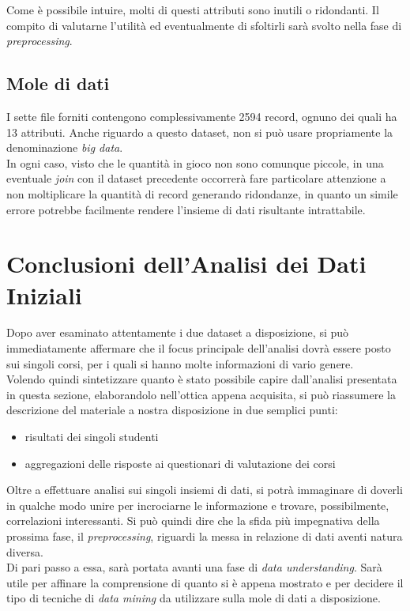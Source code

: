 Come è possibile intuire, molti di questi attributi sono inutili o ridondanti. Il compito di valutarne l'utilità ed eventualmente di sfoltirli sarà svolto nella fase di \textit{preprocessing}.

\subsection{Mole di dati}

I sette file forniti contengono complessivamente 2594 record, ognuno dei quali ha 13 attributi. Anche riguardo a questo dataset, non si può usare propriamente la denominazione \textit{big data}.\\

In ogni caso, visto che le quantità in gioco non sono comunque piccole, in una eventuale \textit{join} con il dataset precedente occorrerà fare particolare attenzione a non moltiplicare la quantità di record generando ridondanze, in quanto un simile errore potrebbe facilmente rendere l'insieme di dati risultante intrattabile.

\section{Conclusioni dell'Analisi dei Dati Iniziali}

Dopo aver esaminato attentamente i due dataset a disposizione, si può immediatamente affermare che il focus principale dell'analisi dovrà essere posto sui singoli corsi, per i quali si hanno molte informazioni di vario genere. \\

Volendo quindi sintetizzare quanto è stato possibile capire dall'analisi presentata in questa sezione, elaborandolo nell'ottica appena acquisita, si può riassumere la descrizione del materiale a nostra disposizione in due semplici punti:

\begin{itemize}
	\item risultati dei singoli studenti
	\item aggregazioni delle risposte ai questionari di valutazione dei corsi
\end{itemize}

Oltre a effettuare analisi sui singoli insiemi di dati, si potrà immaginare di doverli in qualche modo unire per incrociarne le informazione e trovare, possibilmente, correlazioni interessanti. Si può quindi dire che la sfida più impegnativa della prossima fase, il \textit{preprocessing}, riguardi la messa in relazione di dati aventi natura diversa. \\

Di pari passo a essa, sarà portata avanti una fase di \textit{data understanding}. Sarà utile per affinare la comprensione di quanto si è appena mostrato e per decidere il tipo di tecniche di \textit{data mining} da utilizzare sulla mole di dati a disposizione.
